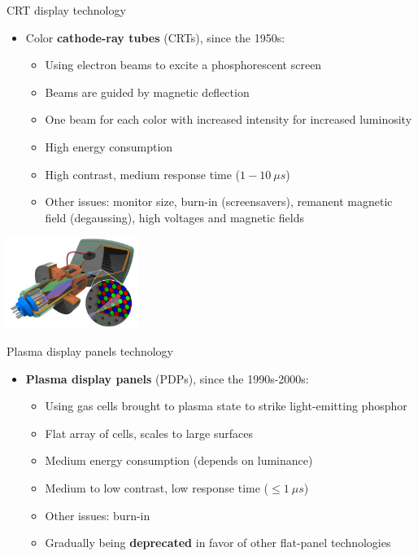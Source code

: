 \begin{frame}{CRT display technology}
  \begin{itemize}
  \item Color \textbf{cathode-ray tubes} (CRTs), since the 1950s:
    \begin{itemize}
    \item Using electron beams to excite a phosphorescent screen
    \item Beams are guided by magnetic deflection
    \item One beam for each color with increased intensity for increased luminosity
    \item High energy consumption
    \item High contrast, medium response time (\(1-10~\mu s\))
    \item Other issues: monitor size, burn-in (screensavers), remanent magnetic field (degaussing), high voltages and magnetic fields
    \end{itemize}
  \end{itemize}

  \begin{center}
  \includegraphics[height=8em]{slides/graphics-hardware/crt-color.png}
  \end{center}
\end{frame}

\begin{frame}{Plasma display panels technology}
  \begin{itemize}
  \item \textbf{Plasma display panels} (PDPs), since the 1990s-2000s:
    \begin{itemize}
    \item Using gas cells brought to plasma state to strike light-emitting phosphor
    \item Flat array of cells, scales to large surfaces
    \item Medium energy consumption (depends on luminance)
    \item Medium to low contrast, low response time (\(\leq 1~\mu s\))
    \item Other issues: burn-in
    \item Gradually being \textbf{deprecated} in favor of other flat-panel technologies
    \end{itemize}
  \end{itemize}
\end{frame}

